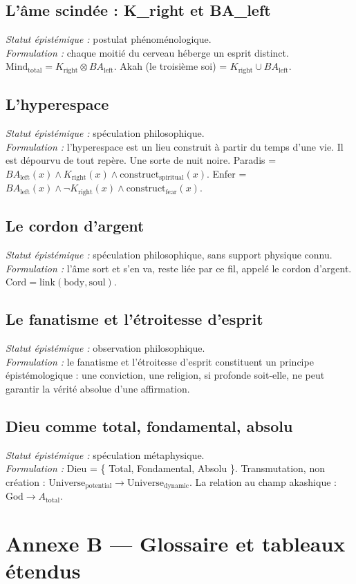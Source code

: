 \subsection{L'âme scindée : K\_right et BA\_left}
\textit{Statut épistémique :} postulat phénoménologique. \\
\textit{Formulation :} chaque moitié du cerveau héberge un esprit distinct. $\text{Mind}_{\text{total}} = K_{\text{right}} \otimes BA_{\text{left}}$. Akah (le troisième soi) = $K_{\text{right}} \cup BA_{\text{left}}$.

\subsection{L'hyperespace}
\textit{Statut épistémique :} spéculation philosophique. \\
\textit{Formulation :} l'hyperespace est un lieu construit à partir du temps d'une vie. Il est dépourvu de tout repère. Une sorte de nuit noire. Paradis = $BA_{\text{left}}(x) \land K_{\text{right}}(x) \land \text{construct}_{\text{spiritual}}(x)$. Enfer = $BA_{\text{left}}(x) \land \neg K_{\text{right}}(x) \land \text{construct}_{\text{fear}}(x)$.

\subsection{Le cordon d'argent}
\textit{Statut épistémique :} spéculation philosophique, sans support physique connu. \\
\textit{Formulation :} l'âme sort et s'en va, reste liée par ce fil, appelé le cordon d'argent. $\text{Cord} = \text{link}(\text{body}, \text{soul})$.

\subsection{Le fanatisme et l'étroitesse d'esprit}
\textit{Statut épistémique :} observation philosophique. \\
\textit{Formulation :} le fanatisme et l'étroitesse d'esprit constituent un principe épistémologique : une conviction, une religion, si profonde soit-elle, ne peut garantir la vérité absolue d'une affirmation.

\subsection{Dieu comme total, fondamental, absolu}
\textit{Statut épistémique :} spéculation métaphysique. \\
\textit{Formulation :} Dieu = \{ Total, Fondamental, Absolu \}. Transmutation, non création : $\text{Universe}_{\text{potential}} \to \text{Universe}_{\text{dynamic}}$. La relation au champ akashique : $\text{God} \to A_{\text{total}}$.

\section{Annexe B --- Glossaire et tableaux étendus}
